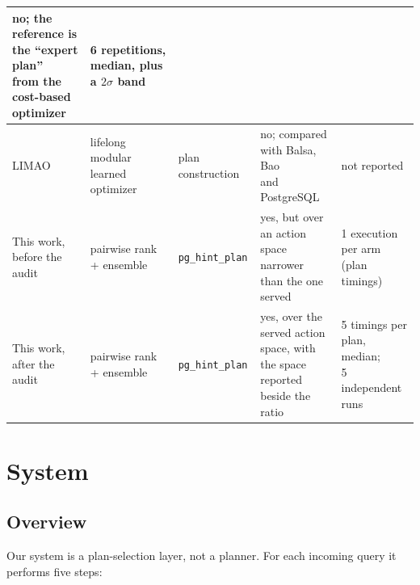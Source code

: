 \documentclass[conference]{IEEEtran}
\begin{document}
\begin{table}[t]
\begin{tabular}{|l|l|l|l|l|}
  \makecell[l]{no; the reference is the ``expert plan''\\
               from the cost-based optimizer} &
  \makecell[l]{6 repetitions, median,\\plus a $2\sigma$ band} \\
\hline
LIMAO~\cite{limao} & \makecell[l]{lifelong modular\\learned optimizer} &
  plan construction &
  \makecell[l]{no; compared with Balsa, Bao\\
               and PostgreSQL} &
  not reported \\
\hline\hline
\makecell[l]{This work,\\before the audit} &
  \makecell[l]{pairwise rank\\+ ensemble} & \texttt{pg\_hint\_plan} &
  \makecell[l]{yes, but over an action space narrower\\
               than the one served} &
  \makecell[l]{1 execution per arm\\(plan timings)} \\
\hline
\makecell[l]{This work,\\after the audit} &
  \makecell[l]{pairwise rank\\+ ensemble} & \texttt{pg\_hint\_plan} &
  \makecell[l]{yes, over the served action space, with\\
               the space reported beside the ratio} &
  \makecell[l]{5 timings per plan, median;\\5 independent runs} \\
\hline
\end{tabular}
\end{table}

\section{System}
\label{sec:system}

\subsection{Overview}

Our system is a plan-selection layer, not a planner. For each incoming query it
performs five steps:
\end{document}
